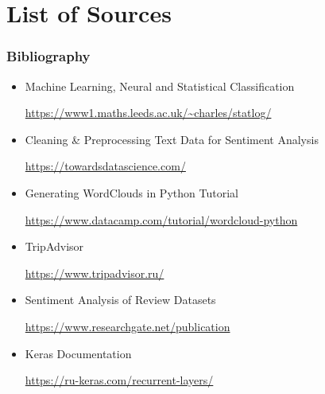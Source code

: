 
\section{List of Sources}

\begin{frame}
\frametitle{Bibliography}
\begin{itemize}
\item Machine Learning, Neural and Statistical Classification 

\url{https://www1.maths.leeds.ac.uk/~charles/statlog/}

\item Cleaning & Preprocessing Text Data for Sentiment Analysis 

\url{https://towardsdatascience.com/}

\item Generating WordClouds in Python Tutorial 

\url{https://www.datacamp.com/tutorial/wordcloud-python}

\item TripAdvisor

\url{https://www.tripadvisor.ru/}

\item Sentiment Analysis of Review Datasets

\url{https://www.researchgate.net/publication}

\item Keras Documentation

\url{https://ru-keras.com/recurrent-layers/}

\end{itemize}
\end{frame}



